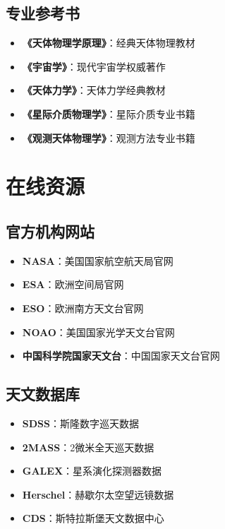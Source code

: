 \documentclass[12pt,UTF8]{ctexbook}
\begin{document}
\section{专业参考书}

\begin{itemize}
  \item \textbf{《天体物理学原理》}：经典天体物理教材
  \item \textbf{《宇宙学》}：现代宇宙学权威著作
  \item \textbf{《天体力学》}：天体力学经典教材
  \item \textbf{《星际介质物理学》}：星际介质专业书籍
  \item \textbf{《观测天体物理学》}：观测方法专业书籍
\end{itemize}

\chapter{在线资源}
\section{官方机构网站}

\begin{itemize}
  \item \textbf{NASA}：美国国家航空航天局官网
  \item \textbf{ESA}：欧洲空间局官网
  \item \textbf{ESO}：欧洲南方天文台官网
  \item \textbf{NOAO}：美国国家光学天文台官网
  \item \textbf{中国科学院国家天文台}：中国国家天文台官网
\end{itemize}

\section{天文数据库}

\begin{itemize}
  \item \textbf{SDSS}：斯隆数字巡天数据
  \item \textbf{2MASS}：2微米全天巡天数据
  \item \textbf{GALEX}：星系演化探测器数据
  \item \textbf{Herschel}：赫歇尔太空望远镜数据
  \item \textbf{CDS}：斯特拉斯堡天文数据中心
\end{itemize}
\end{document}

